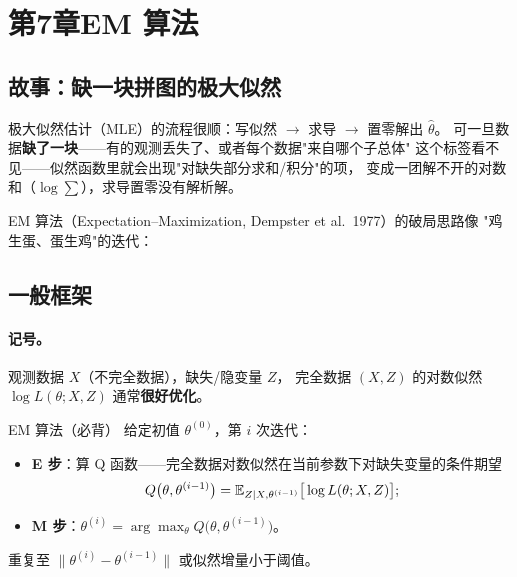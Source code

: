 \section{第7章\quad EM 算法}

\subsection{故事：缺一块拼图的极大似然}

极大似然估计（MLE）的流程很顺：写似然 $\to$ 求导 $\to$ 置零解出 $\hat\theta$。
可一旦数据\textbf{缺了一块}——有的观测丢失了、或者每个数据"来自哪个子总体"
这个标签看不见——似然函数里就会出现"对缺失部分求和/积分"的项，
变成一团解不开的对数和（$\log\sum$），求导置零没有解析解。

EM 算法（Expectation--Maximization, Dempster et al.\ 1977）的破局思路像
"鸡生蛋、蛋生鸡"的迭代：
\begin{center}
\end{center}

\subsection{一般框架}

\paragraph{记号。}观测数据 $X$（不完全数据），缺失/隐变量 $Z$，
完全数据 $(X,Z)$ 的对数似然 $\log L(\theta;X,Z)$ 通常\textbf{很好优化}。

\begin{kbox}{EM 算法（必背）}
给定初值 $\theta^{(0)}$，第 $i$ 次迭代：
\begin{itemize}[leftmargin=2em]
  \item \textbf{E 步}：算 Q 函数——完全数据对数似然在当前参数下对缺失变量的条件期望
  \[
  Q\big(\theta,\theta^{(i-1)}\big)
  =\mathbb{E}_{Z\mid X,\theta^{(i-1)}}\big[\log L(\theta;X,Z)\big];
  \]
  \item \textbf{M 步}：$\theta^{(i)}=\arg\max_\theta Q\big(\theta,\theta^{(i-1)}\big)$。
\end{itemize}
重复至 $\|\theta^{(i)}-\theta^{(i-1)}\|$ 或似然增量小于阈值。
\end{kbox}

